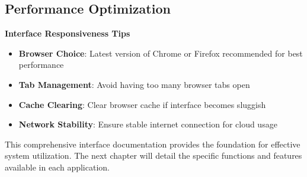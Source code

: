 \subsection{Performance Optimization}

\textbf{Interface Responsiveness Tips}

\begin{itemize}
    \item \textbf{Browser Choice}: Latest version of Chrome or Firefox recommended for best performance
    \item \textbf{Tab Management}: Avoid having too many browser tabs open
    \item \textbf{Cache Clearing}: Clear browser cache if interface becomes sluggish
    \item \textbf{Network Stability}: Ensure stable internet connection for cloud usage
\end{itemize}

This comprehensive interface documentation provides the foundation for effective system utilization. The next chapter will detail the specific functions and features available in each application.